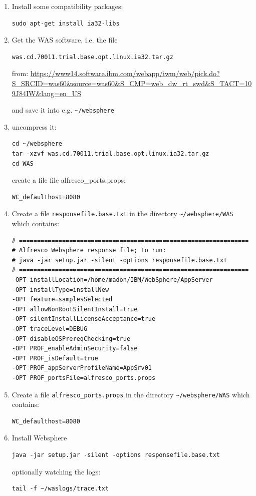 \documentclass[10pt,a4]{article}
\begin{document}
\begin{enumerate}
\item Install some compatibility packages:
\begin{verbatim}
sudo apt-get install ia32-libs
\end{verbatim}
\item Get the WAS software, i.e. the file 
\begin{verbatim}
was.cd.70011.trial.base.opt.linux.ia32.tar.gz
\end{verbatim}
from:
\url{https://www14.software.ibm.com/webapp/iwm/web/pick.do?S_SRCID=was60&source=was60&S_CMP=web_dw_rt_swd&S_TACT=109J84IW&lang=en_US}

and save it into e.g. {\tt \textasciitilde/websphere}
\item uncompress it:
\begin{verbatim}
cd ~/websphere
tar -xzvf was.cd.70011.trial.base.opt.linux.ia32.tar.gz
cd WAS
\end{verbatim}
create a file file alfresco\_ports.props:
\begin{verbatim}
WC_defaulthost=8080
\end{verbatim}
\item Create a file {\tt responsefile.base.txt} in the directory {\tt \textasciitilde/websphere/WAS} which contains:
\begin{verbatim}
# ================================================================
# Alfresco Websphere response file; To run:
# java -jar setup.jar -silent -options responsefile.base.txt 
# ================================================================
-OPT installLocation=/home/madon/IBM/WebSphere/AppServer
-OPT installType=installNew
-OPT feature=samplesSelected
-OPT allowNonRootSilentInstall=true
-OPT silentInstallLicenseAcceptance=true
-OPT traceLevel=DEBUG
-OPT disableOSPrereqChecking=true
-OPT PROF_enableAdminSecurity=false
-OPT PROF_isDefault=true
-OPT PROF_appServerProfileName=AppSrv01
-OPT PROF_portsFile=alfresco_ports.props
\end{verbatim}
\item Create a file {\tt alfresco\_ports.props} in the directory {\tt \textasciitilde/websphere/WAS} which contains:
\begin{verbatim}
WC_defaulthost=8080
\end{verbatim}

\item Install Websphere
\begin{verbatim}
java -jar setup.jar -silent -options responsefile.base.txt 
\end{verbatim}
optionally watching the logs:
\begin{verbatim}
tail -f ~/waslogs/trace.txt
\end{verbatim}


\end{enumerate}
\end{document}
